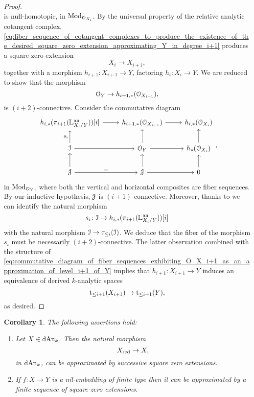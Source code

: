\documentclass[10pt,a4paper,reqno]{amsart} %
\theoremstyle{plain}
\newtheorem{cor}[thm]{Corollary}
\theoremstyle{definition}
\theoremstyle{remark}
\numberwithin{equation}{section}
\begin{document}
\begin{proof}
\begin{equation}
        \end{equation}
    is null-homotopic, in $\mathrm{Mod}_{\mathcal O_{X_i}}$. By the universal property of the relative analytic cotangent complex,
    \eqref{eq:fiber_sequence_of_cotangent_complexes_to_produce_the_existence_of_the_desired_square_zero_extension_approximating_Y_in_degree_i+1}
    produces a square-zero extension
        \[
            X_i  \to X_{i+1},
        \]
    together with a morphism $h_{i+1} \colon X_{i+1} \to Y$, factoring $h_i \colon X_i \to Y$. We  are reduced to show that the morphism
        \[
            \mathcal O_Y \to h_{i+1, *}(\mathcal O_{X_{i+1}}), 
        \]
    is $(i+2)$-connective. Consider the commutative diagram
        \begin{equation} \label{eq:commutative_diagram_of_fiber_sequences_exhibiting_O_X_i+1_as_an_approximation_of_level_i+1_of_Y}
        \begin{tikzcd}
            h_{i, *}(\pi_{i+1}(\bbL\an_{X_i/Y}))[i] \ar{r} & h_{i+1, *}(\cO_{X_{i+1}}) \ar{r} & h_{i, *}(\cO_{X_i}) \\
            \cI \ar{r} \ar{u}{s_i} & \cO_Y \ar{r} \ar{u} & h_*(\cO_{X_i}) \ar{u} \\
            \cJ \ar{r}{=} \ar{u} & \cJ \ar{r} \ar{u} & 0 \ar{u}
        \end{tikzcd},
        \end{equation}
    in $\mathrm{Mod}_{\mathcal O_Y}$, where both the vertical and horizontal composites are fiber sequences. By our inductive hypothesis, $\mathcal J$ is $(i+1)$-connective.
    Moreover, thanks to \cite[Proposition 5.34]{Porta_Yu_Representability} we can identify the natural
    morphism    
        \[
           s_i \colon \mathcal I \to h_{i, *}(\pi_{i+1}(\mathbb L^\mathrm{an}_{X_i/Y}))[i]
        \]
    with the natural morphism $\mathcal I \to \tau_{\le i}(\mathcal I)$. We deduce that the fiber of the morphism $s_i$ must be necessarily $(i+2)$-connective. The latter observation
    combined with the structure of \eqref{eq:commutative_diagram_of_fiber_sequences_exhibiting_O_X_i+1_as_an_approximation_of_level_i+1_of_Y}
    implies that $h_{i+1} \colon X_{i+1} \to Y$ induces an equivalence of derived $k$-analytic spaces
        \[
            \mathrm t_{\le i+1}(X_{i+1}) \to \mathrm t_{\le i+1}(Y),  
        \]
    as desired.
\end{proof}

\begin{cor} The following assertions hold:
    \begin{enumerate}
        \item Let $X \in \mathrm{dAn}_k$. Then the natural morphism
          \[
                X_{\mathrm{red}} \to X,  
            \]
        in $\mathrm{dAn}_k$, can be \emph{approximated} by successive square zero extensions.
        \item If $f \colon X \to Y$ is a nil-embedding of finite type then it can be approximated by a finite sequence of square-zero extensions.
    \end{enumerate}
\end{cor}
\end{document}
